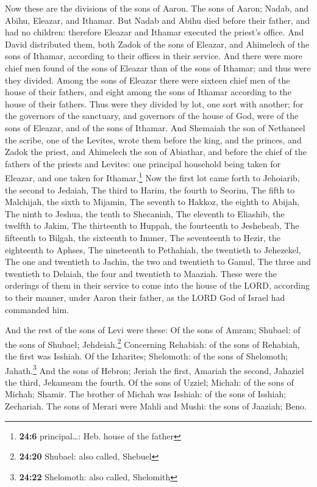  Now these are the divisions of the sons of Aaron. The
sons of Aaron; Nadab, and Abihu, Eleazar, and Ithamar. 
But Nadab and Abihu died before their father, and had no children:
therefore Eleazar and Ithamar executed the priest's office.
 And David distributed them, both Zadok of the sons of
Eleazar, and Ahimelech of the sons of Ithamar, according to their
offices in their service.  And there were more chief men
found of the sons of Eleazar than of the sons of Ithamar; and thus were
they divided. Among the sons of Eleazar there were sixteen chief men of
the house of their fathers, and eight among the sons of Ithamar
according to the house of their fathers.  Thus were they
divided by lot, one sort with another; for the governors of the
sanctuary, and governors of the house of God, were of the sons of
Eleazar, and of the sons of Ithamar.  And Shemaiah the son
of Nethaneel the scribe, one of the Levites, wrote them before the king,
and the princes, and Zadok the priest, and Ahimelech the son of
Abiathar, and before the chief of the fathers of the priests and
Levites: one principal household being taken for Eleazar, and one taken
for Ithamar.\footnote{\textbf{24:6} principal\ldots: Heb. house of the
  father}  Now the first lot came forth to Jehoiarib, the
second to Jedaiah,  The third to Harim, the fourth to
Seorim,  The fifth to Malchijah, the sixth to Mijamin,
 The seventh to Hakkoz, the eighth to Abijah,
 The ninth to Jeshua, the tenth to Shecaniah,
 The eleventh to Eliashib, the twelfth to Jakim,
 The thirteenth to Huppah, the fourteenth to Jeshebeab,
 The fifteenth to Bilgah, the sixteenth to Immer,
 The seventeenth to Hezir, the eighteenth to Aphses,
 The nineteenth to Pethahiah, the twentieth to Jehezekel,
 The one and twentieth to Jachin, the two and twentieth
to Gamul,  The three and twentieth to Delaiah, the four
and twentieth to Maaziah.  These were the orderings of
them in their service to come into the house of the LORD, according to
their manner, under Aaron their father, as the LORD God of Israel had
commanded him.

 And the rest of the sons of Levi were these: Of the sons
of Amram; Shubael: of the sons of Shubael; Jehdeiah.\footnote{\textbf{24:20}
  Shubael: also called, Shebuel}  Concerning Rehabiah: of
the sons of Rehabiah, the first was Isshiah.  Of the
Izharites; Shelomoth: of the sons of Shelomoth; Jahath.\footnote{\textbf{24:22}
  Shelomoth: also called, Shelomith}  And the sons of
Hebron; Jeriah the first, Amariah the second, Jahaziel the third,
Jekameam the fourth.  Of the sons of Uzziel; Michah: of
the sons of Michah; Shamir.  The brother of Michah was
Isshiah: of the sons of Isshiah; Zechariah.  The sons of
Merari were Mahli and Mushi: the sons of Jaaziah; Beno.


